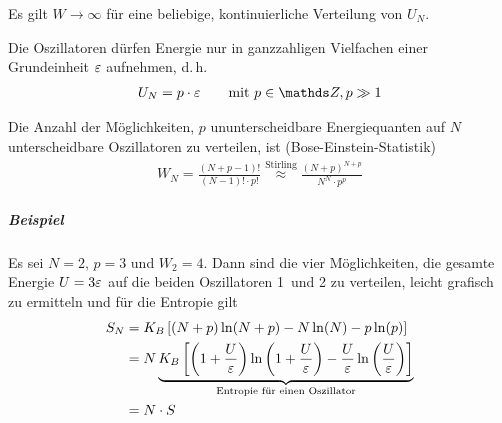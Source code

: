  Es gilt $W\to\infty$ für eine beliebige,
kontinuierliche Verteilung von $U_N$.

\begin{postulat}[Quantenpostulat]
  Die Oszillatoren dürfen Energie nur in ganzzahligen Vielfachen einer
  Grundeinheit $\varepsilon$ aufnehmen, d.\,h.
  \begin{gather*}
    U_N = p\cdot \eps 
    \qquad \text{mit } p\in\Z, p\gg 1
  \end{gather*}
\end{postulat}

\begin{postulat}
  Die Anzahl der Möglichkeiten, $p$ ununterscheidbare
  Energiequanten auf $N$ unterscheidbare Oszillatoren zu verteilen,
  ist (Bose-Einstein-Statistik)
  \begin{gather*}
    W_N = \frac{(N+p-1)!}{(N-1)!\cdot p!}
    \overset{\text{Stirling}}{\approx} 
    \frac{(N+p)^{N+p}}{N^N \cdot p^p}
  \end{gather*}
\end{postulat}  

\subparagraph{Beispiel}
Es sei $N=2$, $p=3$ und $W_2=4$.
Dann sind die vier Möglichkeiten, die gesamte Energie $U=3\varepsilon$ auf
die beiden Oszillatoren 1~und 2 zu verteilen, leicht grafisch zu
ermitteln
und für die Entropie gilt
\begin{align*}
  S_N &= K_B \left[
        (N+p)\ln(N+p) - N\ln(N) - p\ln(p)
        \right]\\
  &= N \underbrace{
    K_B \left[
    \left(1+\frac{U}{\varepsilon}\right) \ln\left(1+\frac{U}{\varepsilon}\right) 
    - \frac{U}{\varepsilon}\ln\left(\frac{U}{\varepsilon}\right)
    \right]
    }_{\text{Entropie für einen Oszillator}}\\
  &= N\cdot S
\end{align*}




